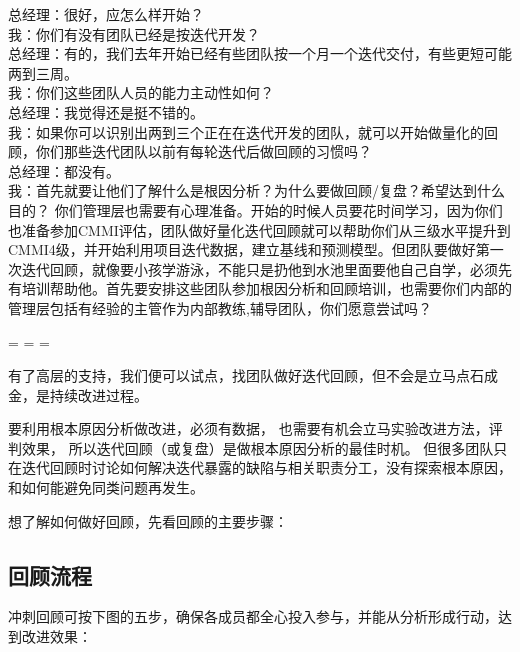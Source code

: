 
总经理：很好，应怎么样开始？\\
我：你们有没有团队已经是按迭代开发？ \\
总经理：有的，我们去年开始已经有些团队按一个月一个迭代交付，有些更短可能两到三周。\\
我：你们这些团队人员的能力主动性如何？\\
总经理：我觉得还是挺不错的。\\
我：如果你可以识别出两到三个正在在迭代开发的团队，就可以开始做量化的回顾，你们那些迭代团队以前有每轮迭代后做回顾的习惯吗？\\
总经理：都没有。\\
我：首先就要让他们了解什么是根因分析？为什么要做回顾/复盘？希望达到什么目的？ 你们管理层也需要有心理准备。开始的时候人员要花时间学习，因为你们也准备参加CMMI评估，团队做好量化迭代回顾就可以帮助你们从三级水平提升到CMMI4级，并开始利用项目迭代数据，建立基线和预测模型。但团队要做好第一次迭代回顾，就像要小孩学游泳，不能只是扔他到水池里面要他自己自学，必须先有培训帮助他。首先要安排这些团队参加根因分析和回顾培训，也需要你们内部的管理层包括有经验的主管作为内部教练,辅导团队，你们愿意尝试吗？\\

\begin{description}
\tightlist
\item[]
= = =
\end{description}

有了高层的支持，我们便可以试点，找团队做好迭代回顾，但不会是立马点石成金，是持续改进过程。

要利用根本原因分析做改进，必须有数据， 也需要有机会立马实验改进方法，评判效果， 所以迭代回顾（或复盘）是做根本原因分析的最佳时机。 但很多团队只在迭代回顾时讨论如何解决迭代暴露的缺陷与相关职责分工，没有探索根本原因， 和如何能避免同类问题再发生。

想了解如何做好回顾，先看回顾的主要步骤：

\hypertarget{ux56deux987eux6d41ux7a0b}{%
\subsection{回顾流程}\label{ux56deux987eux6d41ux7a0b}}

冲刺回顾可按下图的五步，确保各成员都全心投入参与，并能从分析形成行动，达到改进效果：\\


